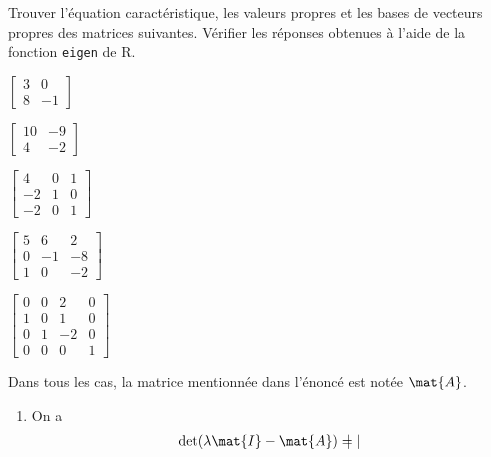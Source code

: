 \begin{exercice}
  \label{ex:valeurspropres:base}
  Trouver l'équation caractéristique, les valeurs propres et les bases
  de vecteurs propres des matrices suivantes. Vérifier les réponses
  obtenues à l'aide de la fonction \texttt{eigen} de R.
  \begin{enumerate}
    \begin{multicols}{2}
    \item $\begin{bmatrix} 3 & 0 \\ 8 & -1 \end{bmatrix}$
    \item $\begin{bmatrix} 10 & -9 \\ 4 & -2 \end{bmatrix}$
    \end{multicols}
    \begin{multicols}{2}
    \item $\begin{bmatrix}
        4 & 0 & 1 \\
        -2 & 1 & 0 \\
        -2 & 0 & 1
      \end{bmatrix}$
    \item $\begin{bmatrix}
        5 &  6 &  2 \\
        0 & -1 & -8 \\
        1 &  0 & -2
      \end{bmatrix}$
    \end{multicols}
    \begin{multicols}{2}
    \item $\begin{bmatrix}
        0 & 0 &  2 & 0 \\
        1 & 0 &  1 & 0 \\
        0 & 1 & -2 & 0 \\
        0 & 0 &  0 & 1
      \end{bmatrix}$
    \end{multicols}
  \end{enumerate}
  \begin{sol}
    Dans tous les cas, la matrice mentionnée dans l'énoncé est notée
    $\mat{A}$.
    \begin{enumerate}
    \item On a
      \begin{align*}
        \det(\lambda \mat{I} - \mat{A})
        &=
        \begin{vmatrix}

\end{vmatrix}
\end{align*}
\end{enumerate}
\end{sol}
\end{exercice}
